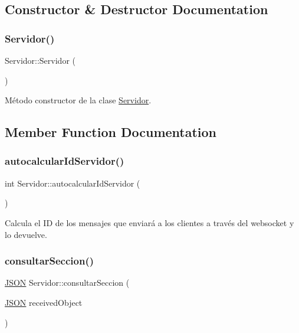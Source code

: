 \subsection{Constructor \& Destructor Documentation}
\mbox{\label{classServidor_a6be6f59fd470098d8d79bfa22c378b81}} 
\subsubsection{\texorpdfstring{Servidor()}{Servidor()}}
{\footnotesize\ttfamily Servidor\+::\+Servidor (\begin{DoxyParamCaption}{ }\end{DoxyParamCaption})}

Método constructor de la clase \mbox{\hyperlink{classServidor}{Servidor}}. 

\subsection{Member Function Documentation}
\mbox{\label{classServidor_a292f87f595ed2afd654abe3cc5ba8dc0}} 
\subsubsection{\texorpdfstring{autocalcular\+Id\+Servidor()}{autocalcularIdServidor()}}
{\footnotesize\ttfamily int Servidor\+::autocalcular\+Id\+Servidor (\begin{DoxyParamCaption}{ }\end{DoxyParamCaption})}

Calcula el ID de los mensajes que enviará a los clientes a través del websocket y lo devuelve. \mbox{\label{classServidor_a172605658340719264d589037d2417d8}} 
\subsubsection{\texorpdfstring{consultar\+Seccion()}{consultarSeccion()}}
{\footnotesize\ttfamily \mbox{\hyperlink{classnlohmann_1_1basic__json}{J\+S\+ON}} Servidor\+::consultar\+Seccion (\begin{DoxyParamCaption}\item[{\mbox{\hyperlink{classnlohmann_1_1basic__json}{J\+S\+ON}}}]{received\+Object }\end{DoxyParamCaption})}

